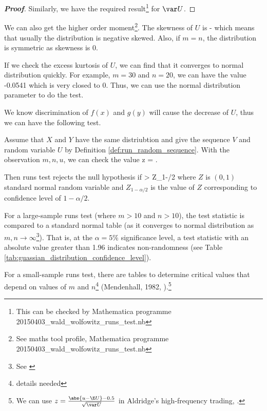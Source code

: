 \begin{proof}[\bf Proof]
Similarly, we have the required result\footnote{This can be checked by Mathematica programme 20150403\_wald\_wolfowitz\_runs\_test.nb} for $\var U$.
\end{proof}

\begin{remark}
We can also get the higher order moment\footnote{See maths tool profile, Mathematica programme 20150403\_wald\_wolfowitz\_runs\_test.nb}. The skewness of $U$ is
\be
-
\ee
which means that usually the distribution is negative skewed. Also, if $m=n$, the distribution is symmetric as skewness is 0.

If we check the excess kurtosis of $U$, we can find that it converges to normal distribution quickly. For example, $m=30$ and $n=20$, we can have the value -0.0541 which is very closed to 0. Thus, we can use the normal distribution parameter to do the test.
\end{remark}

We know discrimination of $f(x)$ and $g(y)$ will cause the decrease of $U$, thus we can have the following test.%

\begin{proposition}\label{pro:wald_wolfowitz_runs_test}
Assume that $X$ and $Y$ have the same distriubtion and give the sequence $V$ and random variable $U$ by Definition \ref{def:run_random_sequence}. With the observation $m,n,u$, we can check the value
\be
z = .
\ee

Then runs test rejects the null hypothesis if 
\be
{} > Z_{1-\alpha/2}
\ee
where $Z$ is $(0,1)$ standard normal random variable and $Z_{1-\alpha/2}$ is the value of $Z$ corresponding to confidence level of $1-\alpha/2$.


For a large-sample runs test (where $m > 10$ and $n > 10$), the test statistic is compared to a standard normal table (as it converges to normal distribution as $m,n\to \infty$\footnote{See \cite{Wald_Wolfowitz_1940}}). That is, at the $\alpha = 5\%$ significance level, a test statistic with an absolute value greater than 1.96 indicates non-randomness (see Table \ref{tab:guassian_distribution_confidence_level}). 

For a small-sample runs test, there are tables to determine critical values that depend on values of $m$ and $n$\footnote{details needed} (Mendenhall, 1982, \cite{Mendenhall_Reinmuth_1982}).\footnote{We can use $z = \frac{\abs{u - \E U}-0.5}{\sqrt{\var U}}$ in Aldridge's high-frequency trading, \cite{Aldridge_2013}.}%
\end{proposition}

